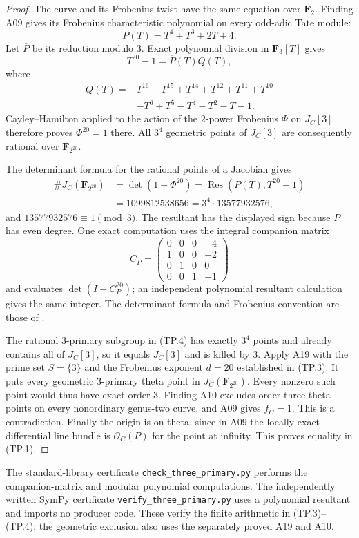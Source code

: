\begin{proof}
The curve and its Frobenius twist have the same equation over
$\mathbf F_2$. Finding A09 gives its Frobenius characteristic
polynomial on every odd-adic Tate module:
\[
                         P(T)=T^4+T^3+2T+4.
 \tag{TP.2}
\]
Let $\overline P$ be its reduction modulo $3$. Exact polynomial
division in $\mathbf F_3[T]$ gives
\[
                       T^{20}-1=\overline P(T)Q(T),
 \tag{TP.3}
\]
where
\[
\begin{aligned}
 Q(T)={}&T^{16}-T^{15}+T^{14}+T^{12}+T^{11}+T^{10}\\
        &-T^6+T^5-T^4-T^2-T-1.
\end{aligned}
\]
Cayley--Hamilton applied to the action of the $2$-power Frobenius
$\Phi$ on $J_C[3]$ therefore proves $\Phi^{20}=1$ there.
All $3^4$ geometric points of $J_C[3]$ are consequently rational
over $\mathbf F_{2^{20}}$.

The determinant formula for the rational points of a Jacobian
gives
\[
\begin{aligned}
 \#J_C(\mathbf F_{2^{20}})
   &=\det(1-\Phi^{20})
     =\operatorname{Res}(P(T),T^{20}-1)\\
   &=1099812538656
     =3^4\cdot13577932576,
\end{aligned}
 \tag{TP.4}
\]
and $13577932576\equiv1\pmod3$.
The resultant has the displayed sign because $P$ has even degree.
One exact computation uses the integral companion matrix
\[
 C_P=\begin{pmatrix}
 0&0&0&-4\\
 1&0&0&-2\\
 0&1&0&0\\
 0&0&1&-1
 \end{pmatrix}
\]
and evaluates $\det(I-C_P^{20})$; an independent polynomial
resultant calculation gives the same integer.
The determinant formula and Frobenius convention are those of
\cite[Theorem~19.1(b), pp.~40--41]{MilneAV}.

The rational $3$-primary subgroup in (TP.4) has exactly $3^4$
points and already contains all of $J_C[3]$, so it equals
$J_C[3]$ and is killed by $3$.
Apply A19 with the prime set $S=\{3\}$ and the Frobenius exponent
$d=20$ established in (TP.3). It puts every geometric
$3$-primary theta point in $J_C(\mathbf F_{2^{20}})$.
Every nonzero such point would thus have exact order $3$.
Finding A10 excludes order-three theta points on every nonordinary
genus-two curve, and A09 gives $f_C=1$. This is a contradiction.
Finally the origin is on theta, since in A09 the locally exact
differential line bundle is $\mathcal O_C(P)$ for the point at
infinity. This proves equality in (TP.1).
\end{proof}

The standard-library certificate \texttt{check\_three\_primary.py}
performs the companion-matrix and modular polynomial computations.
The independently written SymPy certificate
\texttt{verify\_three\_primary.py} uses a polynomial resultant
and imports no producer code. These verify the finite arithmetic
in (TP.3)--(TP.4); the geometric exclusion also uses the separately
proved A19 and A10.
